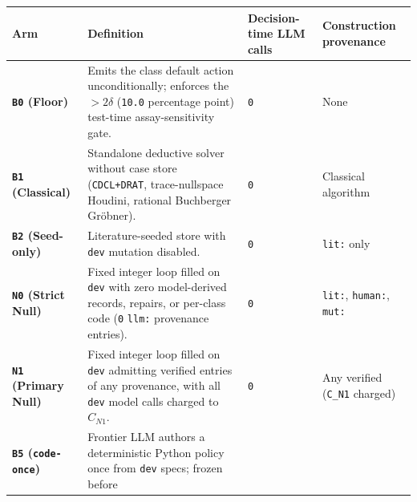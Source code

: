 \documentclass[10pt,letterpaper]{article}
\newcounter{none}
\begin{document}
{\def\LTcaptype{none} %
{\footnotesize\setlength{\tabcolsep}{3.8pt}\renewcommand{\arraystretch}{1.15}
\begin{longtable}[]{@{}
  >{\raggedright\arraybackslash}p{}
  >{\raggedright\arraybackslash}p{}
  >{\raggedright\arraybackslash}p{}
  >{\raggedright\arraybackslash}p{}@{}}
\toprule\noalign{}
\begin{minipage}[b]{\linewidth}\raggedright
\textbf{Arm}
\end{minipage} & \begin{minipage}[b]{\linewidth}\raggedright
\textbf{Definition}
\end{minipage} & \begin{minipage}[b]{\linewidth}\raggedright
\textbf{Decision-time LLM calls}
\end{minipage} & \begin{minipage}[b]{\linewidth}\raggedright
\textbf{Construction provenance}
\end{minipage} \\
\midrule\noalign{}
\endhead
\bottomrule\noalign{}
\endlastfoot
\textbf{\texttt{B0} (Floor)} & Emits the class default action
unconditionally; enforces the \(> 2\delta\) (\texttt{10.0} percentage
point) test-time assay-sensitivity gate. & \texttt{0} & None \\
\textbf{\texttt{B1} (Classical)} & Standalone deductive solver without
case store (\texttt{CDCL+DRAT}, trace-nullspace Houdini, rational
Buchberger Gröbner). & \texttt{0} & Classical algorithm \\
\textbf{\texttt{B2} (Seed-only)} & Literature-seeded store with
\texttt{dev} mutation disabled. & \texttt{0} & \texttt{lit:} only \\
\textbf{\texttt{N0} (Strict Null)} & Fixed integer loop filled on
\texttt{dev} with zero model-derived records, repairs, or per-class code
(\texttt{0} \texttt{llm:} provenance entries). & \texttt{0} &
\texttt{lit:}, \texttt{human:}, \texttt{mut:} \\
\textbf{\texttt{N1} (Primary Null)} & Fixed integer loop filled on
\texttt{dev} admitting verified entries of any provenance, with all
\texttt{dev} model calls charged to \(C_{N1}\). & \texttt{0} & Any
verified (\texttt{C\_N1} charged) \\
\textbf{\texttt{B5} (\texttt{code-once})} & Frontier LLM authors a
deterministic Python policy once from \texttt{dev} specs; frozen before

\end{longtable}}}
\end{document}

